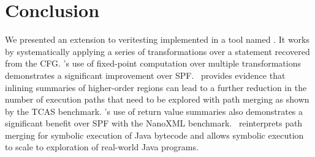 \section{Conclusion}
\label{sec:future}

We presented an extension to veritesting implemented in a tool named \tool.
%
It works by systematically applying a series of transformations over a statement recovered from the CFG.
%
%
%
\tool\rq s use of fixed-point computation over multiple transformations demonstrates a
significant improvement over SPF.
%
\tool\ provides evidence that inlining summaries of higher-order regions can lead to a further reduction in the
number of execution paths that need to be explored with path merging as shown by the TCAS benchmark.
%
\tool\rq s use of return value summaries also demonstrates a significant benefit over SPF with the NanoXML benchmark.
%
%
%
\tool\ reinterprets path merging for symbolic execution of Java bytecode and allows symbolic
execution to scale to exploration of real-world Java programs.


